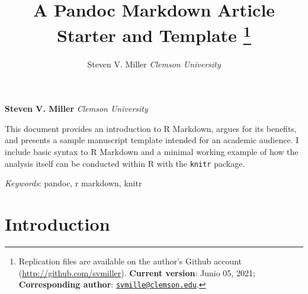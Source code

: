\documentclass[11pt,]{article}
\title{A Pandoc Markdown Article Starter and
Template \thanks{Replication files are available on the author's Github
account (\url{http://github.com/svmiller}). \textbf{Current version}:
Junio 05, 2021; \textbf{Corresponding author}:
\href{mailto:svmille@clemson.edu}{\nolinkurl{svmille@clemson.edu}}.}  }
\author{\Large Steven V.
Miller\vspace{0.05in} \newline\normalsize\emph{Clemson University}  }
\date{}
\newcommand*{\authorfont}{\fontfamily{phv}\selectfont}
\renewenvironment{abstract}
 {{%
    \setlength{\leftmargin}{0mm}
    \setlength{\rightmargin}{\leftmargin}%
  }%
  \relax}
 {\endlist}
\begin{document}
	
%    


{%
\setlength{\parindent}{0pt}
\thispagestyle{plain}
{\fontsize{18}{20}\selectfont\raggedright 
\maketitle  %

}

{
   \vskip 13.5pt\relax \normalsize\fontsize{11}{12} 
\textbf{\authorfont Steven V. Miller} \hskip 15pt \emph{\small Clemson
University}   

}

}








\begin{abstract}

    \hbox{\vrule height .2pt width 39.14pc}

    \vskip 8.5pt %

\noindent This document provides an introduction to R Markdown, argues
for its benefits, and presents a sample manuscript template intended for
an academic audience. I include basic syntax to R Markdown and a minimal
working example of how the analysis itself can be conducted within R
with the \texttt{knitr} package.


\vskip 8.5pt \noindent \emph{Keywords}: pandoc, r markdown, knitr \par

    \hbox{\vrule height .2pt width 39.14pc}



\end{abstract}


\vskip -8.5pt



\noindent  

\hypertarget{introduction}{%
\section{Introduction}\label{introduction}}
\end{document}
